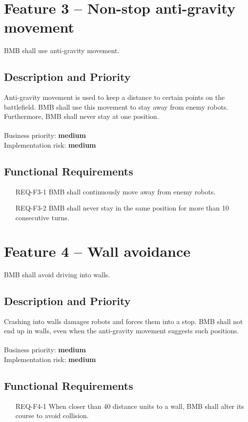 \documentclass{scrreprt}
\begin{document}
\section{Feature 3 -- Non-stop anti-gravity movement}
BMB shall use anti-gravity movement.
	
\subsection{Description and Priority}
Anti-gravity movement is used to keep a distance to certain points on the battlefield. BMB shall use this movement to stay away from enemy robots. Furthermore, BMB shall never stay at one position.\\\\Business priority: \textbf{medium}\\
Implementation risk: \textbf{medium}

\subsection{Functional Requirements}
\begin{itemize}
\item[REQ-F3-1] BMB shall continuously move away from enemy robots.
\item[REQ-F3-2] BMB shall never stay in the same position for more than 10 consecutive turns.
\end{itemize}

\section{Feature 4 -- Wall avoidance}
BMB shall avoid driving into walls.

\subsection{Description and Priority}
Crashing into walls damages robots and forces them into a stop. BMB shall not end up in walls, even when the anti-gravity movement suggests such positions.\\\\Business priority: \textbf{medium}\\
Implementation risk: \textbf{medium}

\subsection{Functional Requirements}
\begin{itemize}
\item[REQ-F4-1] When closer than 40 distance units to a wall, BMB shall alter its course to avoid collision.
\end{itemize}
\end{document}
